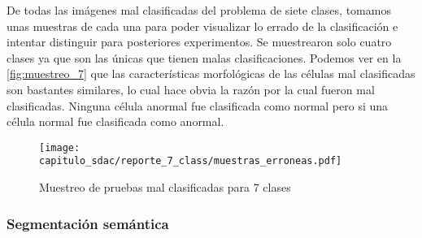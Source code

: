 \begin{table}[H]
    \centering
    \caption{Métricas de diagnóstico de 7 clases}\label{tabla:diag_7}
    \end{table}

De todas las imágenes mal clasificadas del problema de siete clases, tomamos
unas muestras de cada una para poder visualizar lo errado de la clasificación e
intentar distinguir para posteriores experimentos. Se muestrearon solo cuatro
clases ya que son las únicas que tienen malas clasificaciones. Podemos ver en la
\autoref{fig:muestreo_7} que las características morfológicas de las células mal
clasificadas son bastantes similares, lo cual hace obvia la razón por la cual
fueron mal clasificadas. Ninguna célula anormal fue clasificada como normal pero
si una célula normal fue clasificada como anormal.

\begin{figure}[H]
    \centering
    \texttt{[image: capitulo\_sdac/reporte\_7\_class/muestras\_erroneas.pdf]}
    \caption{Muestreo de pruebas mal clasificadas para 7 clases}\label{fig:muestreo_7}
\end{figure}

\subsubsection{Segmentación semántica}

